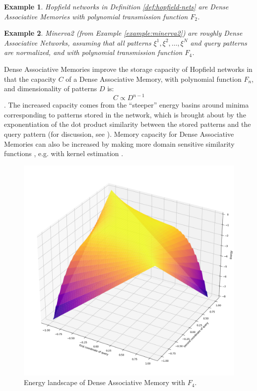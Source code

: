 \documentclass{article}
\newtheorem{example}{Example}[subsection]
\theoremstyle{definition}
\begin{document}
\begin{example}
  Hopfield networks in Definition \ref{def:hopfield-nets} are Dense
  Associative Memories
  with polynomial transmission function $F_2$.
\end{example}

\begin{example}
  Minerva2 (from Example \ref{example:minerva2}) are roughly Dense
  Associative Networks,
  assuming that all patterns $\xi^1, \xi^2, \dots, \xi^N$ and query
  patterns are normalized,
  and with polynomial transmission function $F_4$.
\end{example}

Dense Associative Memories improve the storage capacity of Hopfield networks
in that the capacity $C$ of a Dense Associative Memory, with
polynomial function $F_n$,
and dimensionality of patterns $D$ is:
\begin{equation}
  C \propto D^{n-1}
\end{equation}
\parencites{krotov_dense_2016,demircigil_model_2017,bao_capacity_2022}.
The increased capacity comes from the ``steeper'' energy basins
around minima corresponding to patterns stored in the network, which
is brought about by the exponentiation of the dot product similarity
between the stored patterns and the query pattern (for discussion, see
\textcite{kelly_memory_2017}). Memory capacity for Dense Associative
Memories can also be increased by making more domain sensitive
similarity functions \parencite{millidge_universal_2022},
e.g. with kernel estimation \parencite{hu_provably_2024,wu_uniform_2024}.

\begin{figure}
    \centering
    \includegraphics[width=0.5\linewidth]{energy_landscape_minerva.png}
    \caption{Energy landscape of Dense Associative Memory with $F_4$.}
    \label{fig:energy-landscape-minerva}
\end{figure}
\end{document}
